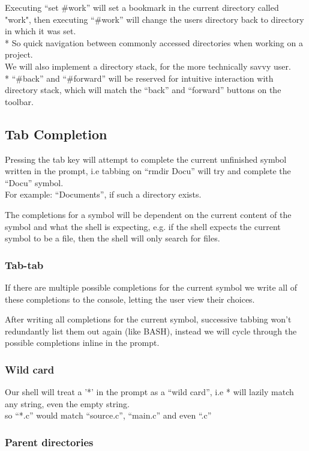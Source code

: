 \documentclass[a4paper,12pt]{article}
\begin{document}
Executing ``set \#work'' will set a bookmark in the current directory called "work", then executing ``\#work'' will change the users directory back to directory in which it was set.\\*
So quick navigation between commonly accessed directories when working on a project.\\[0.5cm]
We will also implement a directory stack, for the more technically savvy user.\\*
``\#back'' and ``\#forward'' will be reserved for intuitive interaction with  directory stack, which will match the ``back'' and ``forward'' buttons on the toolbar.


\pagebreak
\subsection*{Tab Completion}

Pressing the tab key will attempt to complete the current unfinished symbol written in the prompt, i.e tabbing on ``rmdir Docu'' will try and complete the ``Docu'' symbol.\\
For example: ``Documents'', if such a directory exists.

The completions for a symbol will be dependent on the current content of the symbol and what the shell is expecting, e.g. if the shell expects the current symbol to be a file, then the shell will only search for files.

\subsubsection*{Tab-tab}
If there are multiple possible completions for the current symbol we write all of these completions to the console, letting the user view their choices.

After writing all completions for the current symbol, successive tabbing  won't redundantly list them out again (like BASH), instead we will cycle through the possible completions inline in the prompt.  

\subsubsection*{Wild card}
Our shell will treat a '*' in the prompt as a ``wild card'', i.e * will lazily match any string, even the empty string. \\
so ``*.c'' would match ``source.c'', ``main.c'' and even ``.c''

\subsubsection*{Parent directories}
\end{document}
